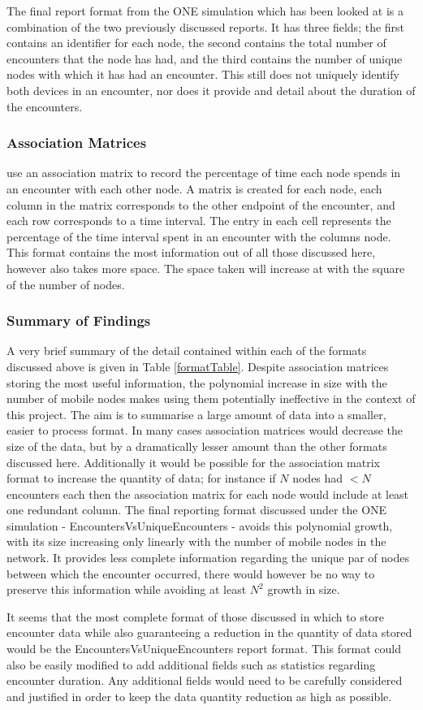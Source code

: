 The final report format from the ONE simulation which has been looked at is a combination of the two previously discussed reports. It has three fields; the first contains an identifier for each node, the second contains the total number of encounters that the node has had, and the third contains the number of unique nodes with which it has had an encounter. This still does not uniquely identify both devices in an encounter, nor does it provide and detail about the duration of the encounters.

\subsubsection{Association Matrices}
\citeauthor{Thakur2012} use an association matrix to record the percentage of time each node spends in an encounter with each other node. A matrix is created for each node, each column in the matrix corresponds to the other endpoint of the encounter, and each row corresponds to a time interval. The entry in each cell represents the percentage of the time interval spent in an encounter with the columns node. This format contains the most information out of all those discussed here, however also takes more space. The space taken will increase at with the square of the number of nodes.



\subsubsection{Summary of Findings}
A very brief summary of the detail contained within each of the formats discussed above is given in Table \ref{formatTable}. Despite association matrices storing the most useful information, the polynomial increase in size with the number of mobile nodes makes using them potentially ineffective in the context of this project. The aim is to summarise a large amount of data into a smaller, easier to process format. In many cases association matrices would decrease the size of the data, but by a dramatically lesser amount than the other formats discussed here. Additionally it would be possible for the association matrix format to increase the quantity of data; for instance if $N$ nodes had $< N$ encounters each then the association matrix for each node would include at least one redundant column. The final reporting format discussed under the ONE simulation - EncountersVsUniqueEncounters - avoids this polynomial growth, with its size increasing only linearly with the number of mobile nodes in the network. It provides less complete information regarding the unique par of nodes between which the encounter occurred, there would however be no way to preserve this information while avoiding at least $N^{2}$ growth in size.

It seems that the most complete format of those discussed in which to store encounter data while also guaranteeing a reduction in the quantity of data stored would be the EncountersVsUniqueEncounters report format. This format could also be easily modified to add additional fields such as statistics regarding encounter duration. Any additional fields would need to be carefully considered and justified in order to keep the data quantity reduction as high as possible.